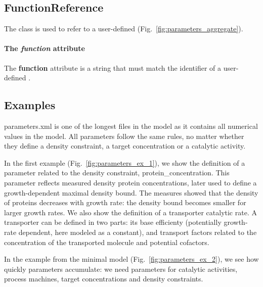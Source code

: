 \subsection{FunctionReference}
\label{sec:function_reference}

The \functionreference{} class is used to refer to a user-defined \function{}
(Fig.~\ref{fig:parameters_aggregate}).

\paragraph{The \textit{function} attribute}
The \textbf{function} attribute is a string that must match the identifier
of a user-defined \function{}.

\subsection{Examples}

parameters.xml is one of the longest files in the model as it contains
all numerical values in the model.
All parameters follow the same rules, no matter whether they define a
density constraint, a target concentration or a catalytic activity.

In the first example (Fig.~\ref{fig:parameters_ex_1}),
we show the definition of a parameter related to the density constraint,
protein\_concentration.
This parameter reflects measured density protein concentrations,
later used to define a growth-dependent maximal density bound.
The measures showed that the density of proteins decreases with growth rate:
the density bound becomes smaller for larger growth rates.
We also show the definition of a transporter catalytic rate.
A transporter can be defined in two parts:
its base efficienty (potentially growth-rate dependent, here modeled as a constant),
and transport factors related to the concentration of the transported molecule
and potential cofactors.

In the example from the minimal model (Fig.~\ref{fig:parameters_ex_2}),
we see how quickly parameters accumulate:
we need parameters for catalytic activities, process machines,
target concentrations and density constraints.


